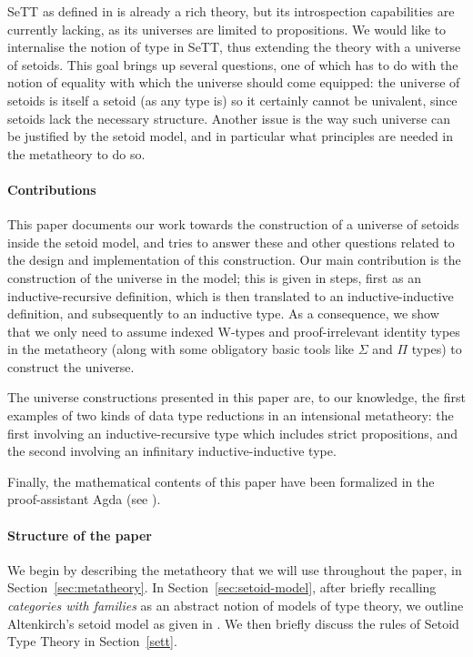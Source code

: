 \documentclass{easychair}
\begin{document}
SeTT as defined in \cite{mpc19} is already a rich theory, but its introspection
capabilities are currently lacking, as its universes are limited to
propositions. We would like to internalise the notion of type in SeTT, thus
extending the theory with a universe of setoids.
%
This goal brings up several questions, one of which has to do with the notion of
equality with which the universe should come equipped: the universe of setoids
is itself a setoid (as any type is) so it certainly cannot be univalent, since
setoids lack the necessary structure.
%
Another issue is the way such universe can be justified by the setoid model, and
in particular what principles are needed in the metatheory to do so.

\paragraph{Contributions}

This paper documents our work towards the construction of a universe of setoids
inside the setoid model, and tries to answer these and other questions related
to the design and implementation of this construction. Our main contribution is
the construction of the universe in the model; this is given in steps, first as
an inductive-recursive definition, which is then translated to an
inductive-inductive definition, and subsequently to an inductive type. As a
consequence, we show that we only need to assume indexed W-types and
proof-irrelevant identity types in the metatheory (along with some obligatory
basic tools like $\Sigma$ and $\Pi$ types) to construct the universe.

The universe constructions presented in this paper are, to our knowledge, the
first examples of two kinds of data type reductions in an intensional
metatheory: the first involving an inductive-recursive type which includes
strict propositions, and the second involving an infinitary inductive-inductive
type.

Finally, the mathematical contents of this paper have been formalized in the
proof-assistant Agda (see \cite{agda-code}).

\paragraph{Structure of the paper}

We begin by describing the metatheory that we will use throughout the paper, in
Section~\ref{sec:metatheory}. In Section~\ref{sec:setoid-model}, after briefly
recalling \emph{categories with families} as an abstract notion of models of
type theory, we outline Altenkirch's setoid model as given in \cite{mpc19}. We
then briefly discuss the rules of Setoid Type Theory in Section~\ref{sett}.
\end{document}
